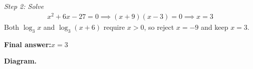 \documentclass[11pt]{article}
\begin{document}
\textit{Step 2: Solve}
\[\begin{gathered}
x^2 + 6x - 27 = 0 \implies (x+9)(x-3) = 0 \implies x = 3
\end{gathered}\]
Both \( \log_3 x \) and \( \log_3(x+6) \) require \( x > 0 \), so reject \( x = -9 \) and keep \( x = 3 \).

\begin{answerbox}
\textbf{Final answer:}\quad \(\displaystyle x = 3\)
\end{answerbox}
\textbf{Diagram.}

\begin{center}
\end{center}
\end{document}
